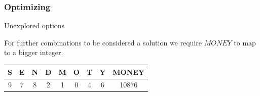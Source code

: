 \begin{frame}
	\frametitle{Optimizing}
	Unexplored options

	\vspace{1cm}

	For further combinations to be considered a solution we require $MONEY$ to map to a bigger integer.

	\vspace{1cm}
	
	\centering
	\begin{tabular}{c|c|c|c|c|c|c|c|c}
		S & E & N & D & M & O & T & Y & MONEY \\
		\hline
		9 & 7 & 8 & 2 & 1 & 0 & 4 & 6 & 10876 \\
	\end{tabular}

\end{frame}
